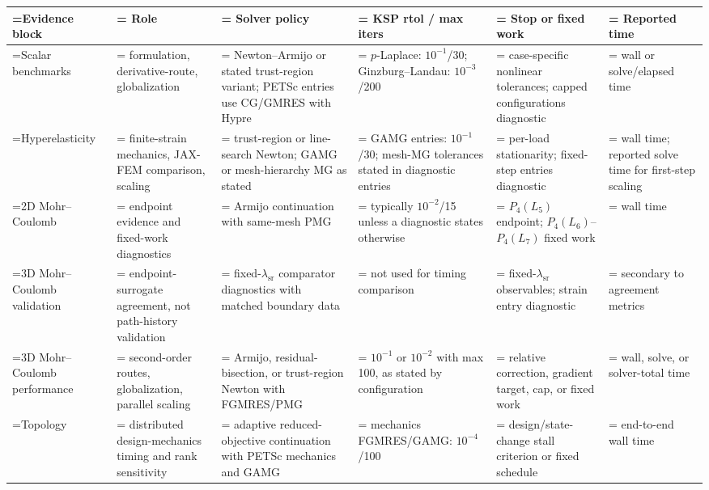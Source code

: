 \begin{tabularx}{\textwidth}{@{}>{\hsize=0.840\hsize\linewidth=\hsize\RaggedRight\arraybackslash}X>{\hsize=0.900\hsize\linewidth=\hsize\RaggedRight\arraybackslash}X>{\hsize=1.260\hsize\linewidth=\hsize\RaggedRight\arraybackslash}X>{\hsize=0.984\hsize\linewidth=\hsize\RaggedRight\arraybackslash}X>{\hsize=1.200\hsize\linewidth=\hsize\RaggedRight\arraybackslash}X>{\hsize=0.816\hsize\linewidth=\hsize\RaggedRight\arraybackslash}X@{}}
\toprule
Evidence block & Role & Solver policy & KSP rtol / max iters & Stop or fixed work & Reported time \\
\midrule
Scalar benchmarks & formulation, derivative-route, globalization & Newton--Armijo or stated trust-region variant; PETSc entries use CG/GMRES with Hypre & $p$-Laplace: $10^{-1}$/30; Ginzburg--Landau: $10^{-3}$/200 & case-specific nonlinear tolerances; capped configurations diagnostic & wall or solve/elapsed time \\
Hyperelasticity & finite-strain mechanics, JAX-FEM comparison, scaling & trust-region or line-search Newton; GAMG or mesh-hierarchy MG as stated & GAMG entries: $10^{-1}$/30; mesh-MG tolerances stated in diagnostic entries & per-load stationarity; fixed-step entries diagnostic & wall time; reported solve time for first-step scaling \\
2D Mohr--Coulomb & endpoint evidence and fixed-work diagnostics & Armijo continuation with same-mesh PMG & typically $10^{-2}$/15 unless a diagnostic states otherwise & $P_4(L_5)$ endpoint; $P_4(L_6)$--$P_4(L_7)$ fixed work & wall time \\
3D Mohr--Coulomb validation & endpoint-surrogate agreement, not path-history validation & fixed-$\lambda_{\mathrm{sr}}$ comparator diagnostics with matched boundary data & not used for timing comparison & fixed-$\lambda_{\mathrm{sr}}$ observables; strain entry diagnostic & secondary to agreement metrics \\
3D Mohr--Coulomb performance & second-order routes, globalization, parallel scaling & Armijo, residual-bisection, or trust-region Newton with FGMRES/PMG & $10^{-1}$ or $10^{-2}$ with max 100, as stated by configuration & relative correction, gradient target, cap, or fixed work & wall, solve, or solver-total time \\
Topology & distributed design-mechanics timing and rank sensitivity & adaptive reduced-objective continuation with PETSc mechanics and GAMG & mechanics FGMRES/GAMG: $10^{-4}$/100 & design/state-change stall criterion or fixed schedule & end-to-end wall time \\
\bottomrule
\end{tabularx}
